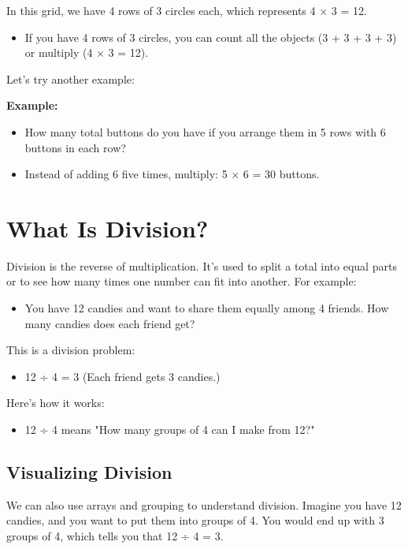 In this grid, we have 4 rows of 3 circles each, which represents 4 × 3 = 12.
\begin{itemize}
    \item If you have 4 rows of 3 circles, you can count all the objects (3 + 3 + 3 + 3) or multiply (4 × 3 = 12).
\end{itemize}

Let’s try another example:

\textbf{Example:}
\begin{itemize}
    \item How many total buttons do you have if you arrange them in 5 rows with 6 buttons in each row?
    \item Instead of adding 6 five times, multiply: 5 × 6 = 30 buttons.
\end{itemize}

\section{What Is Division?}
Division is the reverse of multiplication. It’s used to split a total into equal parts or to see how many times one number can fit into another. For example:
\begin{itemize}
    \item You have 12 candies and want to share them equally among 4 friends. How many candies does each friend get?
\end{itemize}

This is a division problem:
\begin{itemize}
    \item 12 ÷ 4 = 3 (Each friend gets 3 candies.)
\end{itemize}

Here’s how it works:
\begin{itemize}
    \item 12 ÷ 4 means "How many groups of 4 can I make from 12?"
\end{itemize}

\subsection{Visualizing Division}
We can also use arrays and grouping to understand division. Imagine you have 12 candies, and you want to put them into groups of 4. You would end up with 3 groups of 4, which tells you that 12 ÷ 4 = 3.
\begin{center}
\end{center}

